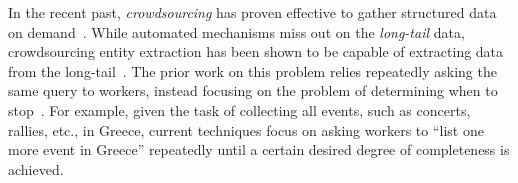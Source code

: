 
In the recent past, 
{\em crowdsourcing} has proven effective to gather structured
data on demand~\cite{franklin:2011,deco, trushkowsky:2013, amsterdamer:2014, park:2014, kondredi:2014}. 
While automated mechanisms miss out on the {\em long-tail} data,
crowdsourcing entity extraction has been shown to be capable of
extracting data from the long-tail~\cite{trushkowsky:2013}.
The prior work on this problem relies 
repeatedly asking the same query to workers,
instead focusing on the problem of determining when to stop~\cite{trushkowsky:2013}. For example, given the task of collecting all events, such as concerts, rallies, etc., in Greece, current techniques focus on asking workers to ``list one more event in Greece'' repeatedly until 
a certain desired degree of completeness is achieved.





